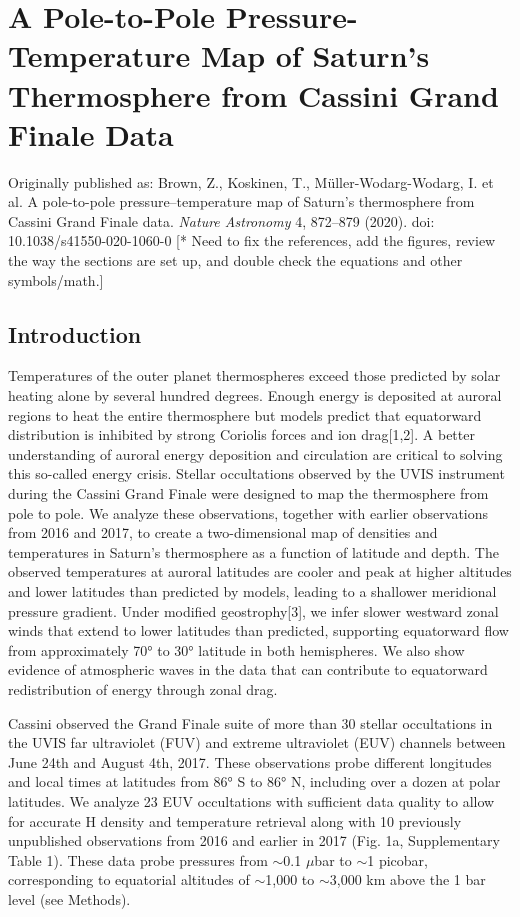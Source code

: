 \chapter{A Pole-to-Pole Pressure-Temperature Map of Saturn's Thermosphere from Cassini Grand Finale Data} 
\thispagestyle{fancy} 

Originally published as: Brown, Z., Koskinen, T., M\"{u}ller-Wodarg-Wodarg, I. et al. A pole-to-pole pressure–temperature map of Saturn’s thermosphere from Cassini Grand Finale data. \textit{Nature Astronomy} 4, 872–879 (2020). doi: 10.1038/s41550-020-1060-0
[* Need to fix the references, add the figures, review the way the sections are set up, and double check the equations and other symbols/math.]

\section{Introduction}
Temperatures of the outer planet thermospheres exceed those predicted by solar heating alone by several hundred degrees. Enough energy is deposited at auroral regions to heat the entire thermosphere but models predict that equatorward distribution is inhibited by strong Coriolis forces and ion drag[1,2]. A better understanding of auroral energy deposition and circulation are critical to solving this so-called energy crisis. Stellar occultations observed by the UVIS instrument during the Cassini Grand Finale were designed to map the thermosphere from pole to pole. We analyze these observations, together with earlier observations from 2016 and 2017, to create a two-dimensional map of densities and temperatures in Saturn’s thermosphere as a function of latitude and depth. The observed temperatures at auroral latitudes are cooler and peak at higher altitudes and lower latitudes than predicted by models, leading to a shallower meridional pressure gradient. Under modified geostrophy[3], we infer slower westward zonal winds that extend to lower latitudes than predicted, supporting equatorward flow from approximately 70° to 30° latitude in both hemispheres. We also show evidence of atmospheric waves in the data that can contribute to equatorward redistribution of energy through zonal drag.

Cassini observed the Grand Finale suite of more than 30 stellar occultations in the UVIS far ultraviolet (FUV) and extreme ultraviolet (EUV) channels between June 24th and August 4th, 2017. These observations probe different longitudes and local times at latitudes from 86° S to 86° N, including over a dozen at polar latitudes. We analyze 23 EUV occultations with sufficient data quality to allow for accurate H density and temperature retrieval along with 10 previously unpublished observations from 2016 and earlier in 2017 (Fig. 1a, Supplementary Table 1). These data probe pressures from $\sim$0.1 $\mu$bar to $\sim$1 picobar, corresponding to equatorial altitudes of $\sim$1,000 to $\sim$3,000 km above the 1 bar level (see Methods).

